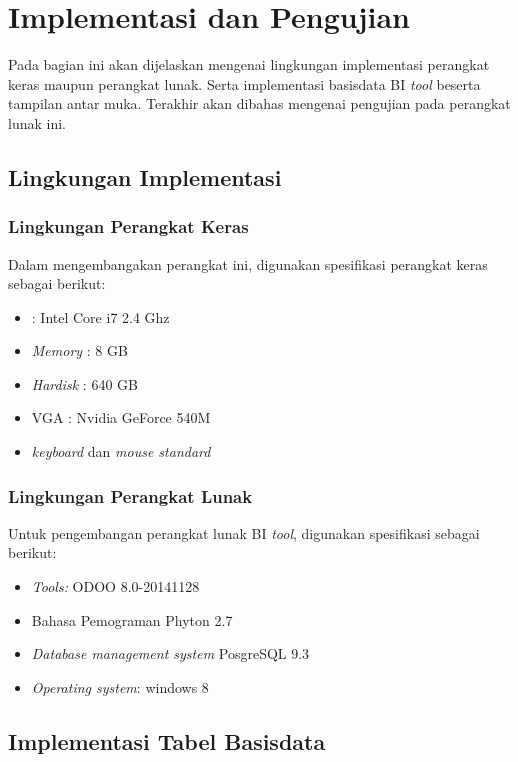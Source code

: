 \chapter{Implementasi dan Pengujian}
\label{chap:implementation}
Pada bagian ini akan dijelaskan mengenai lingkungan implementasi perangkat keras maupun perangkat lunak. Serta implementasi basisdata BI \textit{tool} beserta tampilan antar muka. Terakhir akan dibahas mengenai pengujian pada perangkat lunak ini.
\section{Lingkungan Implementasi}
\subsection{Lingkungan Perangkat Keras}
Dalam mengembangakan perangkat ini, digunakan spesifikasi perangkat keras sebagai berikut:
\begin{itemize}
	\item {} : Intel Core i7 2.4 Ghz
	\item \textit{Memory} : 8 GB
	\item \textit{Hardisk} : 640 GB
	\item VGA : Nvidia GeForce 540M
	\item \textit{keyboard} dan \textit{mouse standard}
\end{itemize}

\subsection{Lingkungan Perangkat Lunak}
Untuk pengembangan perangkat lunak BI \textit{tool}, digunakan spesifikasi sebagai berikut:
\begin{itemize}
	\item \textit{Tools:} ODOO 8.0-20141128
	\item Bahasa Pemograman Phyton 2.7
	\item \textit{Database management system} PosgreSQL 9.3
	\item \textit{Operating system}: windows 8
\end{itemize}

\section{Implementasi Tabel Basisdata}
